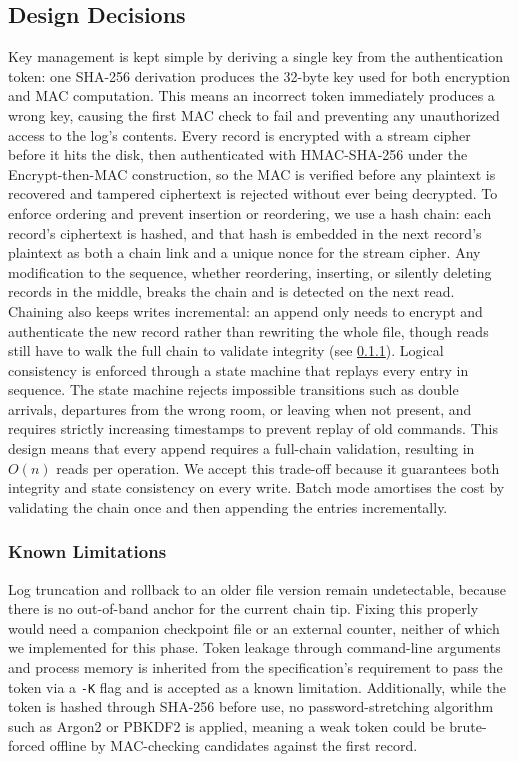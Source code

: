 \documentclass[a4paper, 12pt]{article}
\begin{document}
    \subsection{Design Decisions}
    Key management is kept simple by deriving a single key from the authentication token: one SHA-256 derivation produces the 32-byte key used for both encryption and MAC computation. This means an incorrect token immediately produces a wrong key, causing the first MAC check to fail and preventing any unauthorized access to the log's contents.
    Every record is encrypted with a stream cipher before it hits the disk, then authenticated with HMAC-SHA-256 under the Encrypt-then-MAC construction, so the MAC is verified before any plaintext is recovered and tampered ciphertext is rejected without ever being decrypted.
    To enforce ordering and prevent insertion or reordering, we use a hash chain: each record's ciphertext is hashed, and that hash is embedded in the next record's plaintext as both a chain link and a unique nonce for the stream cipher. Any modification to the sequence, whether reordering, inserting, or silently deleting records in the middle, breaks the chain and is detected on the next read. Chaining also keeps writes incremental: an append only needs to encrypt and authenticate the new record rather than rewriting the whole file, though reads still have to walk the full chain to validate integrity (see \ref{known_limitations}).
    Logical consistency is enforced through a state machine that replays every entry in sequence. The state machine rejects impossible transitions such as double arrivals, departures from the wrong room, or leaving when not present, and requires strictly increasing timestamps to prevent replay of old commands.
    This design means that every append requires a full-chain validation, resulting in $O(n)$ reads per operation. We accept this trade-off because it guarantees both integrity and state consistency on every write. Batch mode amortises the cost by validating the chain once and then appending the entries incrementally.

    \subsubsection{Known Limitations} \label{known_limitations}
    Log truncation and rollback to an older file version remain undetectable, because there is no out-of-band anchor for the current chain tip. Fixing this properly would need a companion checkpoint file or an external counter, neither of which we implemented for this phase. Token leakage through command-line arguments and process memory is inherited from the specification's requirement to pass the token via a \texttt{-K} flag and is accepted as a known limitation. Additionally, while the token is hashed through SHA-256 before use, no password-stretching algorithm such as Argon2 or PBKDF2 is applied, meaning a weak token could be brute-forced offline by MAC-checking candidates against the first record.
\end{document}
